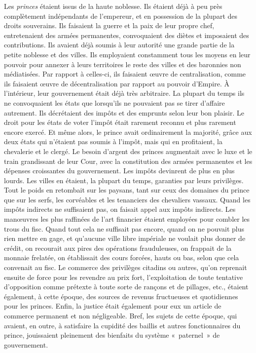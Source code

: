 \documentclass[french,twoside]{book} %
\begin{document}
Les \emph{princes} étaient issus de la haute noblesse. Ils étaient déjà à peu près complètement indépendants de l’empereur, et en possession de la plupart des droits souverains. Ils faisaient la guerre et la paix de leur propre chef, entretenaient des armées permanentes, convoquaient des diètes et imposaient des contributions. Ils avaient déjà soumis à leur autorité une grande partie de la petite noblesse et des villes. Ils employaient constamment tous les moyens en leur pouvoir pour annexer à leurs territoires le reste des villes et des baronnies non médiatisées. Par rapport à celles-ci, ils faisaient œuvre de centralisation, comme ils faisaient œuvre de décentralisation par rapport au pouvoir d’Empire. À l’intérieur, leur gouvernement était déjà très arbitraire. La plupart du temps ils ne convoquaient les états que lorsqu’ils ne pouvaient pas se tirer d’affaire autrement. Ils décrétaient des impôts et des emprunts selon leur bon plaisir. Le droit pour les états de voter l’impôt était rarement reconnu et plus rarement encore exercé. Et même alors, le prince avait ordinairement la majorité, grâce aux deux états qui n’étaient pas soumis à l’impôt, mais qui en profitaient, la chevalerie et le clergé. Le besoin d’argent des princes augmentait avec le luxe et le train grandissant de leur Cour, avec la constitution des armées permanentes et les dépenses croissantes du gouvernement. Les impôts devinrent de plus en plus lourds. Les villes en étaient, la plupart du temps, garanties par leurs privilèges. Tout le poids en retombait sur les paysans, tant sur ceux des domaines du prince que sur les serfs, les corvéables et les tenanciers des chevaliers vassaux. Quand les impôts indirects ne suffisaient pas, on faisait appel aux impôts indirects. Les manœuvres les plus raffinées de l’art financier étaient employées pour combler les trous du fisc. Quand tout cela ne suffisait pas encore, quand on ne pouvait plus rien mettre en gage, et qu’aucune ville libre impériale ne voulait plus donner de crédit, on recourait aux pires des opérations frauduleuses, on frappait de la monnaie frelatée, on établissait des cours forcées, hauts ou bas, selon que cela convenait au fisc. Le commerce des privilèges citadins ou autres, qu’on reprenait ensuite de force pour les revendre au prix fort, l’exploitation de toute tentative d’opposition comme prétexte à toute sorte de rançons et de pillages, etc., étaient également, à cette époque, des sources de revenus fructueuses et quotidiennes pour les princes. Enfin, la justice était également pour eux un article de commerce permanent et non négligeable. Bref, les sujets de cette époque, qui avaient, en outre, à satisfaire la cupidité des baillis et autres fonctionnaires du prince, jouissaient pleinement des bienfaits du système « paternel » de gouvernement.\par
\end{document}
